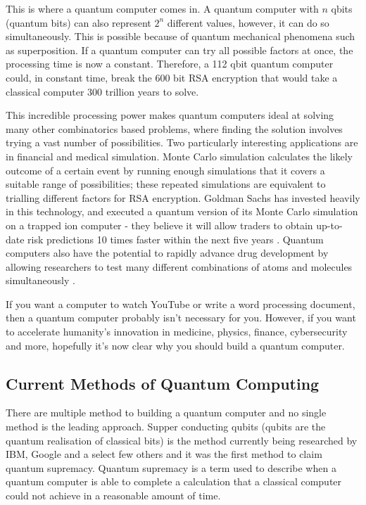This is where a quantum computer comes in. A quantum computer with $n$ qbits (quantum bits) can also represent $2^n$ different values, however, it can do so simultaneously. This is possible because of quantum mechanical phenomena such as superposition. If a quantum computer can try all possible factors at once, the processing time is now a constant. Therefore, a 112 qbit quantum computer could, in constant time, break the 600 bit RSA encryption that would take a classical computer 300 trillion years to solve.

This incredible processing power makes quantum computers ideal at solving many other combinatorics based problems, where finding the solution involves trying a vast number of possibilities. Two particularly interesting applications are in financial and medical simulation. Monte Carlo simulation calculates the likely outcome of a certain event by running enough simulations that it covers a suitable range of possibilities; these repeated simulations are equivalent to trialling different factors for RSA encryption. Goldman Sachs has invested heavily in this technology, and executed a quantum version of its Monte Carlo simulation on a trapped ion computer - they believe it will allow traders to obtain up-to-date risk predictions 10 times faster within the next five years \cite{Giurgica_Tiron_2022}. Quantum computers also have the potential to rapidly advance drug development by allowing researchers to test many different combinations of atoms and molecules simultaneously \cite{bova2021commercial}.

If you want a computer to watch YouTube or write a word processing document, then a quantum computer probably isn't necessary for you. However, if you want to accelerate humanity's innovation in medicine, physics, finance, cybersecurity and more, hopefully it's now clear why you should build a quantum computer.

\subsection{Current Methods of Quantum Computing}
There are multiple method to building a quantum computer and no single method is the leading approach.
Supper conducting qubits (qubits are the quantum realisation of classical bits) is the method currently being researched by IBM, Google and a select few others and it was the first method to claim quantum supremacy. \cite{gibney_hello_2019}
Quantum supremacy is a term used to describe when a quantum computer is able to complete a calculation that a classical computer could not achieve in a reasonable amount of time. 

